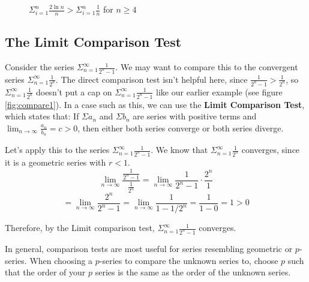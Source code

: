 \begin{figure}
    \centering
    \caption{$\Sigma_{i=1}^n \frac{2\ln{n}}{n} > \Sigma_{i=1}^n \frac{1}{n}$ 
    for $n \geq 4$}
    \label{fig:compare2}
\end{figure}

\subsection{The Limit Comparison Test}
Consider the series $\Sigma_{n=1}^\infty \frac{1}{2^n - 1}$. We may want to compare this to the convergent series $\Sigma_{n=1}^\infty \frac{1}{2^n}$. The direct comparison test isn't helpful here, since $\frac{1}{2^n - 1} > \frac{1}{2^n}$, so $\Sigma_{n=1}^\infty \frac{1}{2^n}$ doesn't put a cap on $\Sigma_{n=1}^\infty \frac{1}{2^n - 1}$ like our earlier example (see figure \ref{fig:compare1}). In a case such as this, we can use the \textbf{Limit Comparison Test}, which states that:
If $\Sigma a_n$ and $\Sigma b_n$ are series with positive terms and $\lim_{n \to \infty} \frac{a_n}{b_n} = c > 0$, then either both series converge or both series diverge.

Let's apply this to the series $\Sigma_{n=1}^\infty \frac{1}{2^n - 1}$. We know that $\Sigma_{n=1}^\infty \frac{1}{2^n}$ converges, since it is a geometric series with $r < 1$. 
$$\lim_{n \to \infty} \frac{\frac{1}{2^n - 1}}{\frac{1}{2^n}} = \lim_{n \to \infty} \frac{1}{2^n - 1} \cdot \frac{2^n}{1}$$
$$= \lim_{n \to \infty} \frac{2^n}{2^n - 1} = \lim_{n \to \infty} \frac{1}{1-1/2^n} = \frac{1}{1-0} = 1 > 0$$

Therefore, by the Limit comparison test, $\Sigma_{n=1}^\infty \frac{1}{2^n - 1}$ converges.

In general, comparison tests are most useful for series resembling geometric or $p$-series. When choosing a $p$-series to compare the unknown series to, choose $p$ such that the order of your $p$ series is the same as the order of the unknown series.

